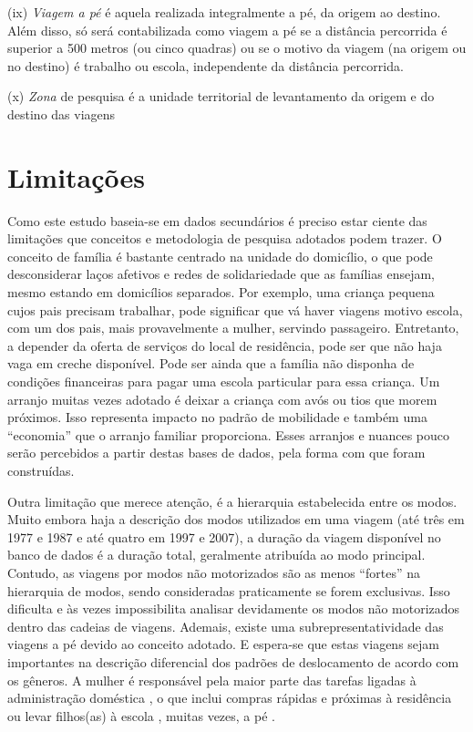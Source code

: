 \begin{compactitem}[]
\item (ix) \emph{Viagem a pé} é aquela realizada integralmente a pé, da origem ao destino. Além disso, só será contabilizada como viagem a pé se a distância percorrida é superior a 500 metros (ou cinco quadras) ou se o motivo da viagem (na origem ou no destino) é trabalho ou escola, independente da distância percorrida.

\item (x) \emph{Zona} de pesquisa é a unidade territorial de levantamento da origem e do destino das viagens
\end{compactitem}

\section{Limitações}\label{sec:limitacoes}

Como este estudo baseia-se em dados secundários é preciso estar ciente das limitações que conceitos e metodologia de pesquisa adotados podem trazer. O conceito de família é bastante centrado na unidade do domicílio, o que pode desconsiderar laços afetivos e redes de solidariedade que as famílias ensejam, mesmo estando em domicílios separados. Por exemplo, uma criança pequena cujos pais precisam trabalhar, pode significar que vá haver viagens motivo escola, com um dos pais, mais provavelmente a mulher, servindo passageiro. Entretanto, a depender da oferta de serviços do local de residência, pode ser que não haja vaga em creche disponível. Pode ser ainda que a família não disponha de  condições financeiras para pagar uma escola particular para essa criança. Um arranjo muitas vezes adotado é deixar a criança com avós ou tios que morem próximos. Isso representa impacto no padrão de mobilidade e também uma ``economia'' que o arranjo familiar proporciona. Esses arranjos e nuances pouco serão percebidos a partir destas bases de dados, pela forma com que foram construídas.

Outra limitação que merece atenção, é a hierarquia estabelecida entre os modos. Muito embora haja a descrição dos modos utilizados em uma viagem (até três em 1977 e 1987 e até quatro em 1997 e 2007), a duração da viagem disponível no banco de dados é a duração total, geralmente atribuída ao modo principal. Contudo, as viagens por modos não motorizados são as menos ``fortes'' na hierarquia de modos, sendo consideradas praticamente se forem exclusivas. Isso dificulta e às vezes impossibilita analisar devidamente os modos não motorizados dentro das cadeias de viagens. 
Ademais, existe uma subrepresentatividade das viagens a pé devido ao conceito adotado. E espera-se que estas viagens sejam importantes na descrição diferencial dos padrões de deslocamento de acordo com os gêneros. A mulher é responsável pela maior parte das tarefas ligadas à administração doméstica \cite{ROOT1999,VANCE2007}, o que inclui compras rápidas e próximas à residência ou levar filhos(as) à escola \cite{FOX1983,FAGNANI1983,IBIPO1992,MCNUCKIN2005,SCHWANEN2002,SONG2003,CRANE2007}, muitas vezes, a pé \cite{VASCONCELLOS2001}.

